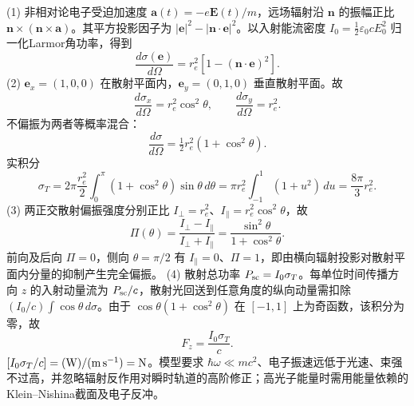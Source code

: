 (1) 非相对论电子受迫加速度 \(\boldsymbol a(t)=-e\boldsymbol E(t)/m\)，远场辐射沿 \(\boldsymbol n\) 的振幅正比 \(\boldsymbol n\times(\boldsymbol n\times\boldsymbol a)\)。其平方投影因子为 \(|\boldsymbol e|^2-|\boldsymbol n\cdot\boldsymbol e|^2\)。以入射能流密度 \(I_0=\frac12\varepsilon_0cE_0^2\) 归一化Larmor角功率，得到
\[
\frac{d\sigma(\boldsymbol e)}{d\Omega}
=r_e^2[1-(\boldsymbol n\cdot\boldsymbol e)^2].
\]
(2) \(\boldsymbol e_x=(1,0,0)\) 在散射平面内，\(\boldsymbol e_y=(0,1,0)\) 垂直散射平面。故
\[
\frac{d\sigma_x}{d\Omega}=r_e^2\cos^2\theta,\qquad
\frac{d\sigma_y}{d\Omega}=r_e^2.
\]
不偏振为两者等概率混合：
\[
\frac{d\sigma}{d\Omega}=\tfrac12r_e^2(1+\cos^2\theta).
\]
实积分
\[
\sigma_T=2\pi\frac{r_e^2}{2}\int_0^\pi(1+\cos^2\theta)\sin\theta\,d\theta
=\pi r_e^2\int_{-1}^{1}(1+u^2)\,du=\frac{8\pi}{3}r_e^2.
\]
(3) 两正交散射偏振强度分别正比 \(I_\perp=r_e^2\)、\(I_\parallel=r_e^2\cos^2\theta\)，故
\[
\Pi(\theta)=\frac{I_\perp-I_\parallel}{I_\perp+I_\parallel}
=\frac{\sin^2\theta}{1+\cos^2\theta}.
\]
前向及后向 \(\Pi=0\)，侧向 \(\theta=\pi/2\) 有 \(I_\parallel=0\)、\(\Pi=1\)，即由横向辐射投影对散射平面内分量的抑制产生完全偏振。
(4) 散射总功率 \(P_{\rm sc}=I_0\sigma_T\)。每单位时间传播方向 \(z\) 的入射动量流为 \(P_{\rm sc}/c\)，散射光回送到任意角度的纵向动量需扣除 \((I_0/c)\int \cos\theta\,d\sigma\)。由于 \(\cos\theta(1+\cos^2\theta)\) 在 \([-1,1]\) 上为奇函数，该积分为零，故
\[
F_z=\frac{I_0\sigma_T}{c}.
\]
\([I_0\sigma_T/c]=({\rm W})/({\rm m\,s^{-1}})={\rm N}\)。模型要求 \(\hbar\omega\ll mc^2\)、电子振速远低于光速、束强不过高，并忽略辐射反作用对瞬时轨道的高阶修正；高光子能量时需用能量依赖的Klein--Nishina截面及电子反冲。
